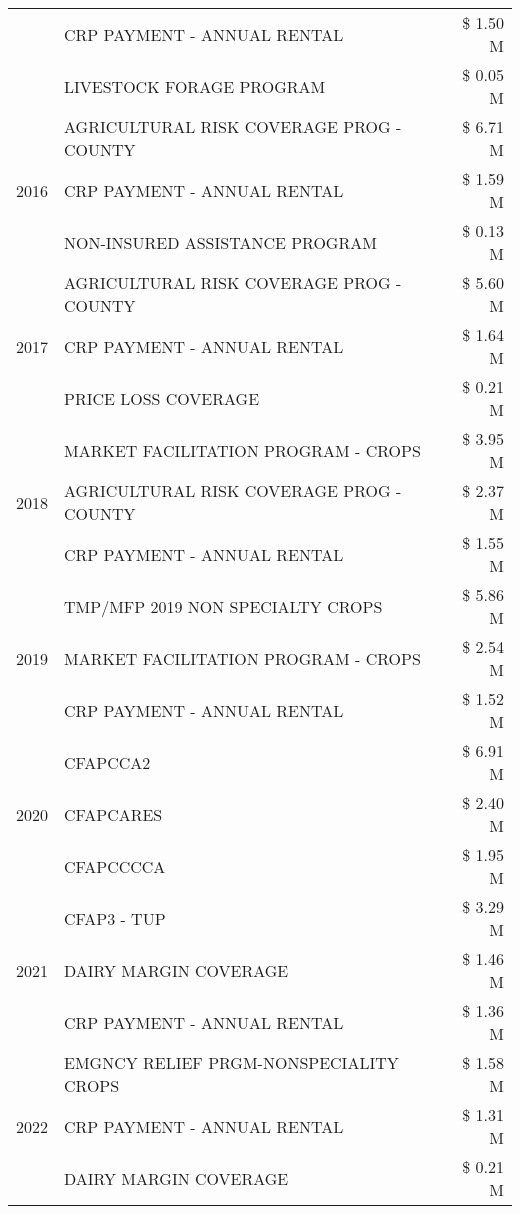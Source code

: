 \begin{tabular}{llr}
 & CRP PAYMENT - ANNUAL RENTAL & \$ 1.50 M \\
 & LIVESTOCK FORAGE PROGRAM & \$ 0.05 M \\
\cline{1-3}
\multirow[t]{3}{*}{2016} & AGRICULTURAL RISK COVERAGE PROG - COUNTY & \$ 6.71 M \\
 & CRP PAYMENT - ANNUAL RENTAL & \$ 1.59 M \\
 & NON-INSURED ASSISTANCE PROGRAM & \$ 0.13 M \\
\cline{1-3}
\multirow[t]{3}{*}{2017} & AGRICULTURAL RISK COVERAGE PROG - COUNTY & \$ 5.60 M \\
 & CRP PAYMENT - ANNUAL RENTAL & \$ 1.64 M \\
 & PRICE LOSS COVERAGE & \$ 0.21 M \\
\cline{1-3}
\multirow[t]{3}{*}{2018} & MARKET FACILITATION PROGRAM - CROPS & \$ 3.95 M \\
 & AGRICULTURAL RISK COVERAGE PROG - COUNTY & \$ 2.37 M \\
 & CRP PAYMENT - ANNUAL RENTAL & \$ 1.55 M \\
\cline{1-3}
\multirow[t]{3}{*}{2019} & TMP/MFP 2019 NON SPECIALTY CROPS & \$ 5.86 M \\
 & MARKET FACILITATION PROGRAM - CROPS & \$ 2.54 M \\
 & CRP PAYMENT - ANNUAL RENTAL & \$ 1.52 M \\
\cline{1-3}
\multirow[t]{3}{*}{2020} & CFAPCCA2 & \$ 6.91 M \\
 & CFAPCARES & \$ 2.40 M \\
 & CFAPCCCCA & \$ 1.95 M \\
\cline{1-3}
\multirow[t]{3}{*}{2021} & CFAP3 - TUP & \$ 3.29 M \\
 & DAIRY MARGIN COVERAGE & \$ 1.46 M \\
 & CRP PAYMENT - ANNUAL RENTAL & \$ 1.36 M \\
\cline{1-3}
\multirow[t]{3}{*}{2022} & EMGNCY RELIEF PRGM-NONSPECIALITY CROPS & \$ 1.58 M \\
 & CRP PAYMENT - ANNUAL RENTAL & \$ 1.31 M \\
 & DAIRY MARGIN COVERAGE & \$ 0.21 M \\
\cline{1-3}
\bottomrule
\end{tabular}
